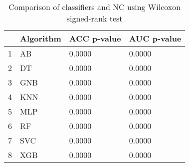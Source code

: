 \begin{table}
\footnotesize
\caption{Comparison of classifiers and NC using Wilcoxon signed-rank test}
\label{tab:wilcoxon comparison}
\begin{tabular}{llll}
\hline
 & Algorithm & ACC p-value & AUC p-value \\
\hline
1 & AB & 0.0000 & 0.0000 \\
2 & DT & 0.0000 & 0.0000 \\
3 & GNB & 0.0000 & 0.0000 \\
4 & KNN & 0.0000 & 0.0000 \\
5 & MLP & 0.0000 & 0.0000 \\
6 & RF & 0.0000 & 0.0000 \\
7 & SVC & 0.0000 & 0.0000 \\
8 & XGB & 0.0000 & 0.0000 \\
\hline
\end{tabular}
\end{table}
